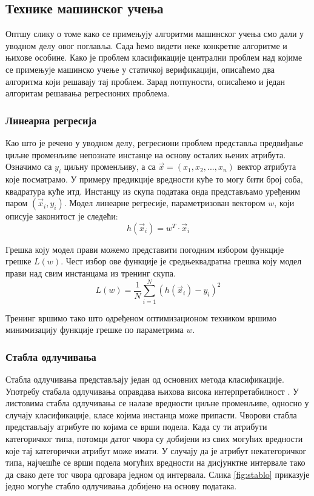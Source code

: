 \documentclass[a4paper]{article}
\begin{document}
{\subsection{Технике машинског учења}
Оптшу слику о томе како се примењују алгоритми машинског учења смо дали у уводном делу овог поглавља. Сада ћемо видети неке конкретне алгоритме и њихове особине. Како је проблем класификације централни проблем над којиме се примењује машинско учење у статичкој верификацији, описаћемо два алгоритма који решавају тај проблем. Зарад потпуности, описаћемо и један алгоритам решавања регресионих проблема.


\subsubsection*{Линеарна регресија}
Као што је речено у уводном делу, регресиони проблем представља предвиђање циљне променљиве непознате инстанце на основу осталих њених атрибута. Означимо са $y_i$ циљну променљиву, а са $\vec{x} = (x_1, x_2, ..., x_n)$ вектор атрибута које посматрамо. У примеру предикције вредности куће то могу бити број соба, квадратура куће итд. Инстанцу из скупа података онда представљамо уређеним паром $(\vec{x}_i, y_i)$. Модел линеарне регресије, параметризован вектором $w$, који описује законитост је следећи:
\begin{equation}
    h(\vec{x}_i) = w^T \cdot \vec{x}_i
\end{equation}


Грешка коју модел прави можемо представити погодним избором функције грешке $L(w)$. Чест избор ове функције је средњеквадратна грешка коју модел прави над свим инстанцама из тренинг скупа.
\begin{equation}
L(w) = \frac{1}{N}\sum \limits_{i=1}^{N} (h(\vec{x}_i) - y_i)^2
\end{equation}

Тренинг вршимо тако што одређеном оптимизационом техником вршимо минимизацију функције грешке по параметрима $w$.


\subsubsection*{Стабла одлучивања}
Стабла одлучивања представљају један од основних метода класификације. Употребу стабала одлучивања оправдава њихова висока интерпретабилност \cite{dct-survey}. У листовима стабла одлучивања се налазе вредности циљне променљиве, односно у случају класификације, класе којима инстанца може припасти. Чворови стабла представљају атрибуте по којима се врши подела. Када су ти атрибути категоричког типа, потомци датог чвора су добијени из свих могућих вредности које тај категорички атрибут може имати. У случају да је атрибут некатегоричког типа, најчешће се врши подела могућих вредности на дисјунктне интервале тако да свако дете тог чвора одговара једном од интервала. Слика \ref{fig:stablo} приказује једно могуће стабло одлучивања добијено на основу података.

}
\end{document}
